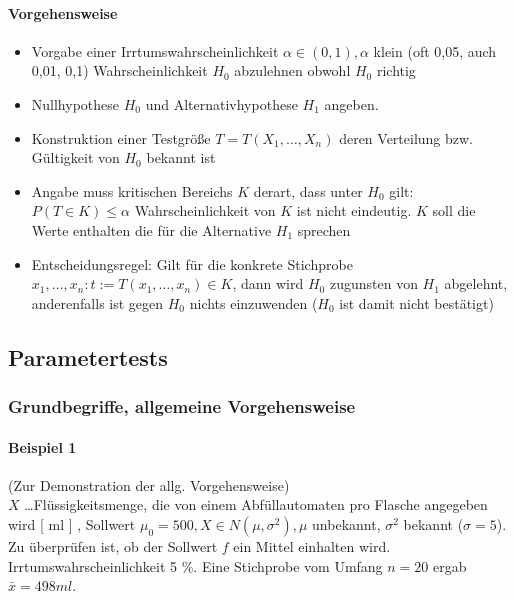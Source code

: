 \documentclass[a4paper]{scrartcl}
\begin{document}
\paragraph{Vorgehensweise}
\begin{itemize}
\item Vorgabe einer Irrtumswahrscheinlichkeit $\alpha \in (0,1), \alpha$ klein (oft 0,05, auch 0,01, 0,1) Wahrscheinlichkeit $H_0$ abzulehnen obwohl $H_0$ richtig
\item Nullhypothese $H_0$ und Alternativhypothese $H_1$ angeben.
\item Konstruktion einer Testgröße $T = T(X_1,\dots,X_n)$ deren Verteilung bzw. Gültigkeit  von $H_0$ bekannt ist
\item Angabe muss kritischen Bereichs $K$ derart, dass unter $H_0$ gilt: $P (T \in K) \leq \alpha$ Wahrscheinlichkeit von $K$ ist nicht eindeutig. $K$ soll die Werte enthalten die für die Alternative $H_1$ sprechen
\item Entscheidungsregel: Gilt für die konkrete Stichprobe  $x_1,\dots,x_n: t:= T(x_1,\dots,x_n) \in K$, dann wird $H_0$ zugunsten von $H_1$ abgelehnt, anderenfalls ist gegen $H_0$ nichts einzuwenden ($H_0$ ist damit nicht bestätigt)
\end{itemize}

\subsection{Parametertests}
\subsubsection{Grundbegriffe, allgemeine Vorgehensweise}
\paragraph{Beispiel 1} (Zur Demonstration der allg. Vorgehensweise)\\
$X$ \dots Flüssigkeitsmenge, die von einem Abfüllautomaten pro Flasche angegeben wird [ ml ] , Sollwert $\mu_0 = 500, X \in N (\mu,\sigma^2), \mu$ unbekannt, $\sigma^2$ bekannt ($\sigma = 5$). Zu überprüfen ist, ob der Sollwert $f$ ein Mittel einhalten wird. Irrtumswahrscheinlichkeit 5 \%. Eine Stichprobe vom Umfang $n=20$ ergab $\bar{x} = 498 ml$. 
\end{document}
